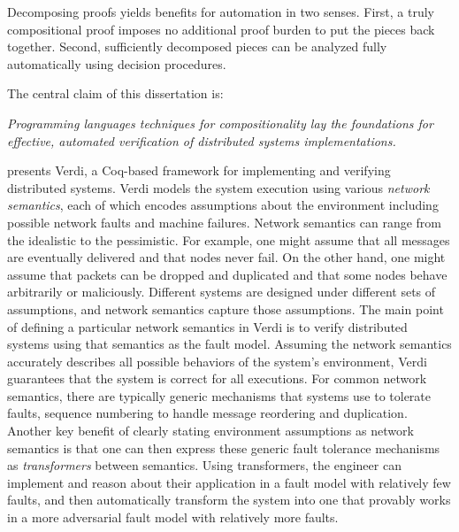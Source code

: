 Decomposing proofs yields benefits for automation in two senses.
First, a truly compositional proof
  imposes no additional proof burden
  to put the pieces back together.
Second, sufficiently decomposed pieces can
  be analyzed fully automatically using decision procedures.

The central claim of this dissertation is:
\begin{center}
\emph{Programming languages techniques for compositionality
  lay the foundations for effective, automated verification of
  distributed systems implementations.
}
\end{center}


 presents Verdi, a Coq-based framework for implementing and
verifying distributed systems.  Verdi models the system execution
using various \emph{network semantics}, each of which encodes
assumptions about the environment including possible network faults
and machine failures.  Network semantics can range from the idealistic
to the pessimistic. For example, one might assume that all messages
are eventually delivered and that nodes never fail. On the other hand,
one might assume that packets can be dropped and duplicated and that
some nodes behave arbitrarily or maliciously. Different systems are
designed under different sets of assumptions, and network semantics
capture those assumptions.
The main point of defining a particular network semantics in Verdi is to verify
distributed systems using that semantics as the fault model.
Assuming the network semantics
accurately describes all possible behaviors of the system's
environment, Verdi guarantees that the system is correct for all executions.
For common network semantics, there are typically generic mechanisms
that systems use to tolerate faults, \eg sequence numbering to handle
message reordering and duplication. Another key benefit of clearly
stating environment assumptions as network semantics is that one
can then express these generic fault tolerance mechanisms as \emph{transformers}
between semantics.
Using transformers, the engineer can implement and reason about their
application in a fault model
with relatively few faults, and then automatically transform the system
into one that provably works in a more adversarial fault model with
relatively more faults. 



